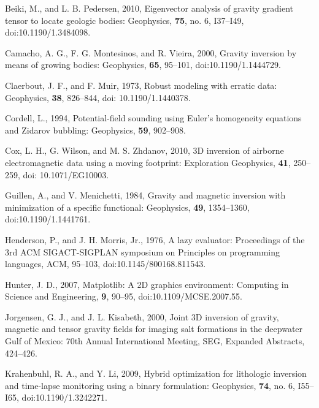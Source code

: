 \newpage

\begin{thebibliography}{}
\itemsep0pt

Beiki, M., and L. B. Pedersen, 2010, Eigenvector analysis of gravity
    gradient tensor to locate geologic bodies: Geophysics, {\bf 75}, no. 6,
    I37--I49, doi:10.1190/1.3484098.
    
Camacho, A. G., F. G. Montesinos, and R. Vieira, 2000, Gravity inversion by
    means of growing bodies: Geophysics, {\bf 65}, 95--101,
    doi:10.1190/1.1444729.

Claerbout, J. F., and F. Muir, 1973, Robust modeling with erratic
    data: Geophysics, {\bf 38}, 826--844, doi: 10.1190/1.1440378.

Cordell, L., 1994, Potential-field sounding using Euler's homogeneity equations
    and Zidarov bubbling: Geophysics, {\bf 59}, 902--908.

Cox, L. H., G. Wilson, and M. S. Zhdanov, 2010, 3D inversion of airborne
    electromagnetic data using a moving footprint: Exploration Geophysics,
    {\bf 41}, 250--259, doi: 10.1071/EG10003.

Guillen, A., and V. Menichetti, 1984, Gravity and magnetic inversion with
    minimization of a specific functional: Geophysics, {\bf 49}, 1354--1360,
    doi:10.1190/1.1441761.

Henderson, P., and J. H. Morris, Jr., 1976, A lazy evaluator: Proceedings
    of the 3rd ACM SIGACT-SIGPLAN symposium on Principles on programming
    languages, ACM, 95--103, doi:10.1145/800168.811543.

Hunter, J. D., 2007, Matplotlib: A 2D graphics environment: Computing in Science
    and Engineering, {\bf 9}, 90--95, doi:10.1109/MCSE.2007.55.
    
Jorgensen, G. J., and J. L. Kisabeth, 2000, Joint 3D inversion of gravity,
    magnetic and tensor gravity fields for imaging salt formations in the
    deepwater Gulf of Mexico: 70th Annual International Meeting, SEG, Expanded
    Abstracts, 424--426.
    
Krahenbuhl, R. A., and Y. Li, 2009, Hybrid optimization for lithologic inversion
    and time-lapse monitoring using a binary formulation: Geophysics, {\bf 74},
    no. 6, I55--I65, doi:10.1190/1.3242271.


\end{thebibliography}
